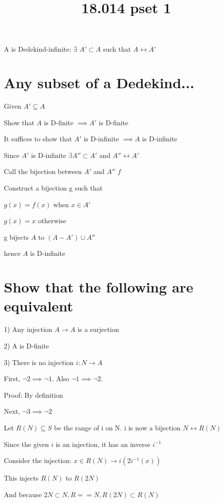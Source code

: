 \documentclass{article}
\title{18.014 pset 1}
\date{}
\begin{document}
\maketitle

A is Dedekind-infinite: $\exists$ $A' \subset A$ such that $A \leftrightarrow A'$

\section{Any subset of a Dedekind...}

Given $A' \subseteq A$

Show that $A$ is D-finite $\implies A'$ is D-finite

It suffices to show that $A'$ is D-infinite $\implies A$ is D-infinite

Since $A'$ is D-infinite $\exists A'' \subset A'$ and $A'' \leftrightarrow A'$

Call the bijection between $A'$ and $A''$ $f$

Construct a bijection g such that

$g(x) = f(x)$ when $x \in A'$

$g(x) = x$ otherwise

g bijects $A$ to $(A - A') \cup A'' $

hence $A$ is D-infinite

\section{Show that the following are equivalent}

1) Any injection $A \rightarrow A$ is a surjection

2) A is D-finite

3) There is no injection $i: N \rightarrow A$

First, $\lnot 2 \implies \lnot 1$. Also $\lnot 1 \implies \lnot 2$. 

Proof: By definition

Next, $\lnot 3 \implies \lnot 2$

Let $R(N) \subseteq S$ be the range of i on N. i is now a bijection $N \leftrightarrow R(N)$

Since the given $i$ is an injection, it has an inverse $i^{-1}$

Consider the injection: $x \in R(N) \rightarrow i(2 i^{-1}(x))$

This injects $R(N)$ to $R(2N)$

And because $2N \subset N, R == N, R(2N) \subset R(N)$
\end{document}
